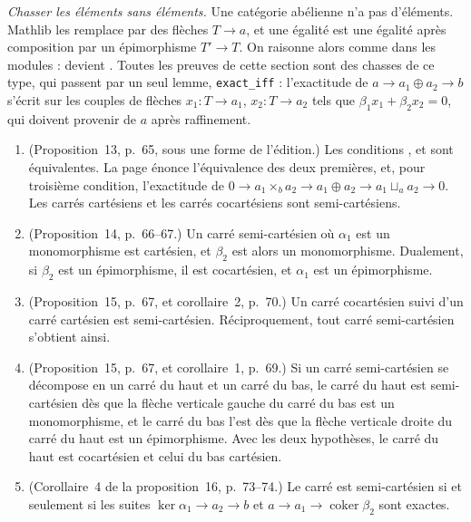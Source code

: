 \emph{Chasser les éléments sans éléments.} Une catégorie abélienne n'a pas d'éléments. Mathlib les remplace par des flèches $T \to a$, et une égalité  est une égalité après composition par un épimorphisme $T' \to T$. On raisonne alors comme dans les modules :  devient . Toutes les preuves de cette section sont des chasses de ce type, qui passent par un seul lemme, \texttt{exact\_iff} : l'exactitude de $a \to a_1 \oplus a_2 \to b$ s'écrit sur les couples de flèches $x_1 : T \to a_1$, $x_2 : T \to a_2$ tels que $\beta_1 x_1 + \beta_2 x_2 = 0$, qui doivent provenir de $a$ après raffinement.

\begin{encadre}
\begin{enonce}
\begin{enumerate}
\item[a)] (Proposition~13, p.~65, sous une forme de l'édition.) Les conditions ,  et  sont équivalentes. La page énonce l'équivalence des deux premières, et, pour troisième condition, l'exactitude de $0 \to a_1 \times_b a_2 \to a_1 \oplus a_2 \to a_1 \sqcup_a a_2 \to 0$. Les carrés cartésiens et les carrés cocartésiens sont semi-cartésiens.
\item[b)] (Proposition~14, p.~66--67.) Un carré semi-cartésien où $\alpha_1$ est un monomorphisme est cartésien, et $\beta_2$ est alors un monomorphisme. Dualement, si $\beta_2$ est un épimorphisme, il est cocartésien, et $\alpha_1$ est un épimorphisme.
\item[c)] (Proposition~15, p.~67, et corollaire~2, p.~70.) Un carré cocartésien suivi d'un carré cartésien est semi-cartésien. Réciproquement, tout carré semi-cartésien s'obtient ainsi.
\item[d)] (Proposition~15, p.~67, et corollaire~1, p.~69.) Si un carré semi-cartésien se décompose en un carré du haut et un carré du bas, le carré du haut est semi-cartésien dès que la flèche verticale gauche du carré du bas est un monomorphisme, et le carré du bas l'est dès que la flèche verticale droite du carré du haut est un épimorphisme. Avec les deux hypothèses, le carré du haut est cocartésien et celui du bas cartésien.
\item[e)] (Corollaire~4 de la proposition~16, p.~73--74.) Le carré est semi-cartésien si et seulement si les suites $\ker \alpha_1 \to a_2 \to b$ et $a \to a_1 \to \operatorname{coker} \beta_2$ sont exactes.
\end{enumerate}
\end{enonce}
\end{encadre}

